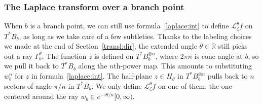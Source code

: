 \documentclass{article}
\theoremstyle{definition}
\newcommand{\maps}{\colon}
\newcommand{\R}{\mathbb{R}}
\newcommand{\C}{\mathbb{C}}
\newcommand{\laplace}{\mathcal{L}}
\newcommand{\borel}{\mathcal{B}}
\theoremstyle{plain}
\begin{document}
\subsubsection{The Laplace transform over a branch point}
When $b$ is a branch point, we can still use formula~\eqref{laplace:int} to define $\laplace_\zeta^\theta f$ on $T^*B_b$, as long as we take care of a few subtleties. Thanks to the labeling choices we made at the end of Section~\ref{transl:dir}, the extended angle $\theta \in \R$ still picks out a ray $\Gamma_b^\theta$. The function $z$ is defined on $T^*B_b^{\otimes n}$, where $2\pi n$ is cone angle at $b$, so we pull it back to $T^*B_b$ along the $n$th-power map. This amounts to substituting $w_b^n$ for $z$ in formula~\eqref{laplace:int}. The half-plane $z \in H_{\theta}$ in $T^*B_b^{\otimes n}$ pulls back to $n$ sectors of angle $\pi/n$ in $T^*B_b$. We only define $\laplace_\zeta^\theta f$ on one of them: the one centered around the ray $w_b \in e^{-i\theta/n}[0, \infty)$.
\end{document}
